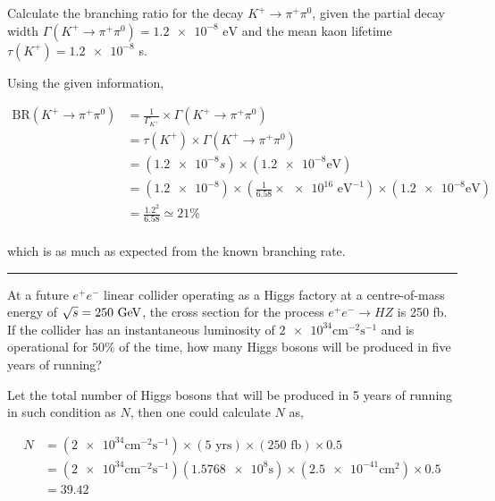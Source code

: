\begin{problem}{3.3}
Calculate the branching ratio for the decay $K^+\to\pi^+\pi^0$, given the partial decay width $\Gamma(K^+\to\pi^+\pi^0)=\num{1.2e-8} \text{ eV}$
and the mean kaon lifetime $\tau(K^+)=\num{1.2e-8}$ s.
\end{problem}
\begin{solution}
Using the given information, 

\begin{align*}
    \text{BR}\left(K^+\to\pi^+\pi^0\right) &= \frac{1}{\Gamma_{K^+}} \times \Gamma\left( K^+ \to \pi^+\pi^0 \right) \\[0.15in]
                                           &= \tau( K^+ )\times \Gamma\left( K^+ \to \pi^+\pi^0 \right) \\[0.15in]
                                           &= \left( \num{1.2e-8}\unit{ s} \right) \times \left( \num{1.2e-8} \text{eV}\right) \\[0.15in]
                                           &= \left( \num{1.2e-8} \right)  \times \left( \frac{1}{6.58} \times \num{e16} \text{ eV}^{-1} \right)  \times \left( \num{1.2e-8} \text{eV}\right) \\[0.15in]
                                           &= \frac{1.2^2}{6.58} \simeq \boxed{21\%}
\end{align*}\\
which is as much as expected from the known branching rate.\\
\end{solution} 
\noindent\rule{7in}{1.5pt}
    

\begin{problem}{3.4}
At a future $e^+e^-$ linear collider operating as a Higgs factory at a centre-of-mass energy of $\sqrt{s}=250\text{ GeV}$, the cross section
for the process $e^+e^-\to HZ$ is 250 fb. If the collider has an instantaneous luminosity of $\num{2e34}\unit{\centi\metre^{-2}\second^{-1}}$
and is operational for $50\%$ of the time, how many Higgs bosons will be produced in five years of running?
\end{problem}
\begin{solution}
Let the total number of Higgs bosons that will be produced in 5 years of running in such condition as $N$, then one could calculate $N$ as,

\begin{align*}
    N &= \left( \num{2e34}\unit{\centi\metre^{-2}\second^{-1}} \right) \times \left( 5 \text{ yrs} \right) \times \left( 250 \text{ fb} \right) \times 0.5 \\[0.15in]
      &= \left( \num{2e34}\unit{\centi\metre^{-2}\second^{-1}} \right) \left( \num{1.5768e8} \unit{\second} \right) \times \left( \num{2.5e-41} \unit{\centi\metre^2} \right) \times 0.5 \\[0.15in]
      &= \num{39.42}
\end{align*}
\end{solution} 

